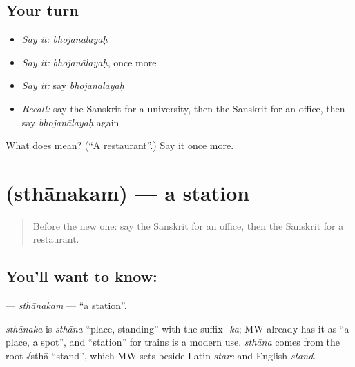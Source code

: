 \subsection*{Your turn}
\begin{itemize}
\raggedright
  \item \emph{Say it:} \emph{bhojanālayaḥ}
  \item \emph{Say it:} \emph{bhojanālayaḥ}, once more
  \item \emph{Say it:} say \emph{bhojanālayaḥ}
  \item \emph{Recall:} say the Sanskrit for a university, then the Sanskrit for an office, then say \emph{bhojanālayaḥ} again
\end{itemize}

\begin{tcolorbox}[breakable,colback=teal!4,colframe=teal!35!black,title={Before you move on}]
What does  mean? (\textquotedblleft{}A restaurant\textquotedblright{}.) Say it once more.
\end{tcolorbox}
\section[\texorpdfstring{\sk{स्थानकम्} (sthānakam)}{स्थानकम् (sthānakam)}]{ (sthānakam) — a station}

\label{lesson:SA-C97-sthanakam}



\begin{quote}
Before the new one: say the Sanskrit for an office, then the Sanskrit for a restaurant.
\end{quote}

\subsection*{You'll want to know: }
\textbf{} — \emph{sthānakam} — \textquotedblleft{}a station\textquotedblright{}.

\begin{cousinweb}
\emph{sthānaka} is \emph{sthāna} \textquotedblleft{}place, standing\textquotedblright{} with the suffix \emph{-ka}; MW already has it as \textquotedblleft{}a place, a spot\textquotedblright{}, and \textquotedblleft{}station\textquotedblright{} for trains is a modern use. \emph{sthāna} comes from the root √sthā \textquotedblleft{}stand\textquotedblright{}, which MW sets beside Latin \emph{stare} and English \emph{stand}.
\end{cousinweb}

